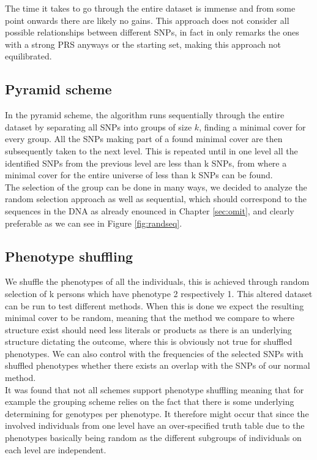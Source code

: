 \documentclass[letterpaper, 11pt]{article}
\begin{document}
The time it takes to go through the entire dataset is immense and from some point onwards there are likely no gains. This approach does not consider all possible relationships between different SNPs, in fact in only remarks the ones with a strong PRS anyways or the starting set, making this approach not equilibrated. 



\subsection{Pyramid scheme}
In the pyramid scheme, the algorithm runs sequentially  through the entire dataset by separating all SNPs into groups of size $k$, finding a minimal cover for every group. All the SNPs making part of a found minimal cover are then subsequently taken to the next level. This is repeated until in one level  all the identified SNPs from the previous level are less than k SNPs, from where a minimal cover for the entire universe of less than k SNPs can be found. \\

The selection of the group can be done in many ways, we decided to analyze the random selection approach as well as sequential, which should correspond to the sequences in the DNA as already enounced in Chapter \ref{sec:omit}, and clearly preferable as we can see in Figure \ref{fig:randseq}.


\subsection{Phenotype shuffling}
We shuffle the phenotypes of all the individuals, this is achieved through random selection of k persons which have phenotype 2 respectively 1. 
This altered dataset can be run to test different methods. When this is done we expect the resulting minimal cover to be random, meaning that the method we compare to where structure exist should need less literals or products as there is an underlying structure dictating the outcome, where this is obviously not true for shuffled phenotypes. We can also control with the frequencies of the selected SNPs with shuffled phenotypes whether there exists an overlap with the SNPs of our normal method. \\
It was found that not all schemes support phenotype shuffling meaning that for example the grouping scheme relies on the fact that there is some underlying determining for genotypes per phenotype. It therefore might occur that since the involved individuals from one level have an over-specified truth table due to the phenotypes basically being random as the different subgroups of individuals on each level are independent.  \\
\end{document}
